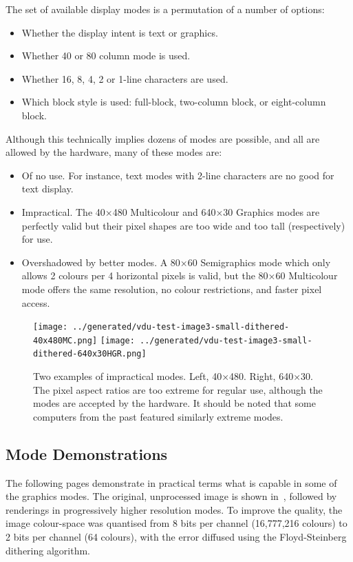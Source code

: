 The set of available display modes is a permutation of a number of options:

\begin{itemize}
  \item Whether the display intent is text or graphics.
  \item Whether 40 or 80 column mode is used.
  \item Whether 16, 8, 4, 2 or 1-line characters are used.
  \item Which block style is used: full-block, two-column block, or eight-column block.
\end{itemize}

Although this technically implies dozens of modes are possible, and all are
allowed by the hardware, many of these modes are:

\begin{itemize}
\item Of no use. For instance, text modes with 2-line characters are no good for text display.
\item Impractical. The 40×480 Multicolour and 640×30 Graphics modes are
  perfectly valid but their pixel shapes are too wide and too tall (respectively) for use.
\item Overshadowed by better modes. A 80×60 Semigraphics mode which only
  allows 2 colours per 4 horizontal pixels is valid, but the 80×60
  Multicolour mode offers the same resolution, no colour restrictions, and
  faster pixel access.
\end{itemize}

\begin{figure}
  \centering
  \texttt{[image: ../generated/vdu-test-image3-small-dithered-40x480MC.png]}
  \hfill
  \texttt{[image: ../generated/vdu-test-image3-small-dithered-640x30HGR.png]}%
  \caption[Two examples of impractical
    modes]{\label{fig:vdu:impractical-modes}Two examples of impractical
    modes. Left, 40×480. Right, 640×30. The pixel aspect ratios are too extreme
    for regular use, although the modes are accepted by the hardware. It should
    be noted that some computers from the past featured similarly extreme
    modes.}
\end{figure}


\subsection{Mode Demonstrations}

The following pages demonstrate in practical terms what is capable in some of
the graphics modes. The original, unprocessed image is shown
in~, followed by renderings in progressively higher
resolution modes. To improve the quality, the image colour-space was quantised
from 8 bits per channel (16,777,216 colours) to 2 bits per channel (64
colours), with the error diffused using the Floyd-Steinberg dithering
algorithm.

